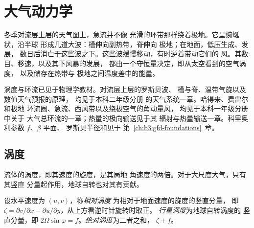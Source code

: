 \chapter{大气动力学}\label{ch:b3:atmospheric-dynamics}

冬季对流层上层的天气图上，急流并不像
光滑的环带那样绕着极地。它呈蜿蜒状，沿半球
形成几道大波：槽伸向副热带，脊伸向
极地；在地面，低压生成、发展，
数日后消亡于这些波之下。这些波缓慢移动，有时逆着带动它们的
风。其数目、移速，以及其下风暴的发展，
都由一个守恒量决定，即从太空看到的空气涡度，
以及储存在热带与
极地之间温度差中的能量。

\begin{recall}
涡度与环流已见于物理学教材。对流层上层的罗斯贝波、
槽与脊、温带气旋以及数值天气预报的原理，
均见于本科二年级分册
的天气系统一章。哈得来、费雷尔和极地
环流圈、急流、西风带以及绕极空气的角动量风，
均见于本科一年级分册中关于
大气总环流的一章；热量的极向输送见于其
辐射与热量输送一章。科里奥利参数 $f$、$\beta$ 平面、
罗斯贝半径和见于
第~\ref{ch:b3:gfd-foundations}~章。
\end{recall}

\section{涡度}\label{sec:b3:atmospheric-dynamics:vorticity}

流体的涡度，即其速度的旋度，是其局地
角速度的两倍。对于大尺度大气，只有其竖直
分量起作用，地球自转也对其有贡献。

\begin{definition}\label{def:b3:atmospheric-dynamics:vorticity-kinds}
设水平速度为 $(u, v)$，称\emph{相对涡度}
为相对于地面速度的旋度的竖直分量，
即 $\zeta = \partial v/\partial x -
\partial u/\partial y$，从上方看逆时针旋转时取正。
\emph{行星涡度}为地球自转涡度的
竖直分量，即 $2\Omega\sin\varphi =
f$。\emph{绝对涡度}为二者之和，
$\zeta + f$。
\end{definition}

